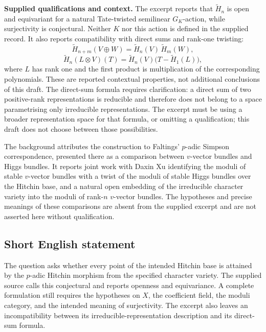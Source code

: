 \documentclass[11pt]{article}
\begin{document}
\textbf{Supplied qualifications and context.} The excerpt reports that \(\widetilde H_n\) is open and equivariant for a natural Tate-twisted semilinear \(G_K\)-action, while surjectivity is conjectural. Neither \(K\) nor this action is defined in the supplied record. It also reports compatibility with direct sums and rank-one twisting:
\[
 \widetilde H_{n+m}(V\oplus W)
 =\widetilde H_n(V)\,\widetilde H_m(W),
\]
\[
 \widetilde H_n(L\otimes V)(T)
 =\widetilde H_n(V)\bigl(T-\widetilde H_1(L)\bigr),
\]
where \(L\) has rank one and the first product is multiplication of the corresponding polynomials. These are reported contextual properties, not additional conclusions of this draft. The direct-sum formula requires clarification: a direct sum of two positive-rank representations is reducible and therefore does not belong to a space parametrising only irreducible representations. The excerpt must be using a broader representation space for that formula, or omitting a qualification; this draft does not choose between those possibilities.

The background attributes the construction to Faltings' \(p\)-adic Simpson correspondence, presented there as a comparison between \(v\)-vector bundles and Higgs bundles. It reports joint work with Daxin Xu identifying the moduli of stable \(v\)-vector bundles with a twist of the moduli of stable Higgs bundles over the Hitchin base, and a natural open embedding of the irreducible character variety into the moduli of rank-\(n\) \(v\)-vector bundles. The hypotheses and precise meanings of these comparisons are absent from the supplied excerpt and are not asserted here without qualification.
\subsection{Short English statement}
The question asks whether every point of the intended Hitchin base is attained by the \(p\)-adic Hitchin morphism from the specified character variety. The supplied source calls this conjectural and reports openness and equivariance. A complete formulation still requires the hypotheses on \(X\), the coefficient field, the moduli category, and the intended meaning of surjectivity. The excerpt also leaves an incompatibility between its irreducible-representation description and its direct-sum formula.
\end{document}
